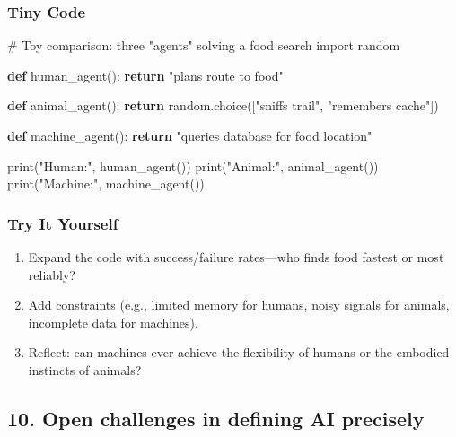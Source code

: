\documentclass[
  letterpaper,
  DIV=11,
  numbers=noendperiod]{scrreprt}
\newenvironment{Shaded}{\begin{snugshade}}{\end{snugshade}}
\newcommand{\BuiltInTok}[1]{\textcolor[rgb]{0.00,0.23,0.31}{#1}}
\newcommand{\CommentTok}[1]{\textcolor[rgb]{0.37,0.37,0.37}{#1}}
\newcommand{\ControlFlowTok}[1]{\textcolor[rgb]{0.00,0.23,0.31}{\textbf{#1}}}
\newcommand{\ImportTok}[1]{\textcolor[rgb]{0.00,0.46,0.62}{#1}}
\newcommand{\KeywordTok}[1]{\textcolor[rgb]{0.00,0.23,0.31}{\textbf{#1}}}
\newcommand{\NormalTok}[1]{\textcolor[rgb]{0.00,0.23,0.31}{#1}}
\newcommand{\StringTok}[1]{\textcolor[rgb]{0.13,0.47,0.30}{#1}}
\providecommand{\tightlist}{%
  \setlength{\itemsep}{0pt}\setlength{\parskip}{0pt}}
\begin{document}
\subsubsection{Tiny Code}\label{tiny-code-8}

\begin{Shaded}
\begin{Highlighting}[]
\CommentTok{\# Toy comparison: three "agents" solving a food search}
\ImportTok{import}\NormalTok{ random}

\KeywordTok{def}\NormalTok{ human\_agent():}
    \ControlFlowTok{return} \StringTok{"plans route to food"}

\KeywordTok{def}\NormalTok{ animal\_agent():}
    \ControlFlowTok{return}\NormalTok{ random.choice([}\StringTok{"sniffs trail"}\NormalTok{, }\StringTok{"remembers cache"}\NormalTok{])}

\KeywordTok{def}\NormalTok{ machine\_agent():}
    \ControlFlowTok{return} \StringTok{"queries database for food location"}

\BuiltInTok{print}\NormalTok{(}\StringTok{"Human:"}\NormalTok{, human\_agent())}
\BuiltInTok{print}\NormalTok{(}\StringTok{"Animal:"}\NormalTok{, animal\_agent())}
\BuiltInTok{print}\NormalTok{(}\StringTok{"Machine:"}\NormalTok{, machine\_agent())}
\end{Highlighting}
\end{Shaded}

\subsubsection{Try It Yourself}\label{try-it-yourself-8}

\begin{enumerate}
\def\labelenumi{\arabic{enumi}.}
\tightlist
\item
  Expand the code with success/failure rates---who finds food fastest or
  most reliably?
\item
  Add constraints (e.g., limited memory for humans, noisy signals for
  animals, incomplete data for machines).
\item
  Reflect: can machines ever achieve the flexibility of humans or the
  embodied instincts of animals?
\end{enumerate}

\subsection{10. Open challenges in defining AI
precisely}\label{open-challenges-in-defining-ai-precisely}
\end{document}
